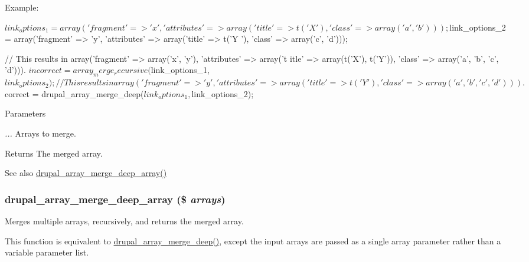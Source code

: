 Example: 
\begin{DoxyCode}
 $link_options_1 = array('fragment' => 'x', 'attributes' => array('title' => t('X
      '), 'class' => array('a', 'b')));
 $link_options_2 = array('fragment' => 'y', 'attributes' => array('title' => t('Y
      '), 'class' => array('c', 'd')));

 // This results in array('fragment' => array('x', 'y'), 'attributes' => array('t
      itle' => array(t('X'), t('Y')), 'class' => array('a', 'b', 'c', 'd'))).
 $incorrect = array_merge_recursive($link_options_1, $link_options_2);

 // This results in array('fragment' => 'y', 'attributes' => array('title' => t('
      Y'), 'class' => array('a', 'b', 'c', 'd'))).
 $correct = drupal_array_merge_deep($link_options_1, $link_options_2);
\end{DoxyCode}



\begin{DoxyParams}{Parameters}
\item[{\em ...}]Arrays to merge.\end{DoxyParams}
\begin{DoxyReturn}{Returns}
The merged array.
\end{DoxyReturn}
\begin{DoxySeeAlso}{See also}
\hyperlink{bootstrap_8inc_a1167ab45bbb945a5e6fd806b536eef70}{drupal\_\-array\_\-merge\_\-deep\_\-array()} 
\end{DoxySeeAlso}
\hypertarget{bootstrap_8inc_a1167ab45bbb945a5e6fd806b536eef70}{
\subsubsection[{drupal\_\-array\_\-merge\_\-deep\_\-array}]{\setlength{\rightskip}{0pt plus 5cm}drupal\_\-array\_\-merge\_\-deep\_\-array (\$ {\em arrays})}}
\label{bootstrap_8inc_a1167ab45bbb945a5e6fd806b536eef70}
Merges multiple arrays, recursively, and returns the merged array.

This function is equivalent to \hyperlink{bootstrap_8inc_a4e822805ef55b0a271ab181c9620837a}{drupal\_\-array\_\-merge\_\-deep()}, except the input arrays are passed as a single array parameter rather than a variable parameter list.

